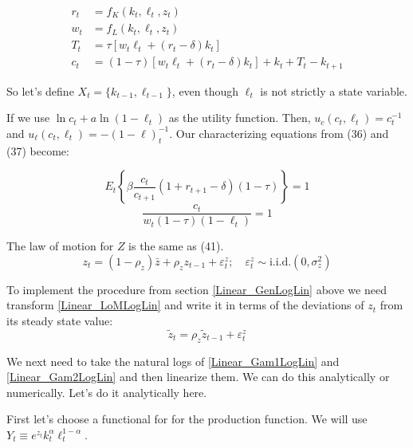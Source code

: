 \documentclass[letterpaper,12pt]{article}
\newcommand{\ve}{\varepsilon}
\theoremstyle{definition}
\begin{document}
\begin{spacing}{1.5}
		\begin{equation}\label{Linear_4defsLogLin}
		\begin{split}
		r_t &= f_K(k_t,\ell_t,z_t) \\
		w_t &= f_L(k_t,\ell_t,z_t) \\
		T_t  &=\tau \left[w_t\ell_t+(r_t-\delta)k_t\right] \\
		c_t &= (1-\tau) \left[w_t\ell_t+(r_t-\delta)k_t\right] + k_t + T_t - k_{t+1}
		\end{split}
		\end{equation}

		So let's define $X_t = \{k_{t-1},\ell_{t-1}\}$, even though $\ell_t$ is not strictly a state variable.

		If we use $\ln c_t + a\ln(1-\ell_t)$ as the utility function. Then, $u_c(c_t,\ell_t) = c_t^{-1}$ and $u_{\ell}(c_t,\ell_t) = -(1-\ell)_t^{-1}$. Our characterizing equations from (36) and (37) become:

		\begin{equation}\label{Linear_Gam1LogLin}
		 E_t\left\{ \beta \frac{c_t}{ c_{t+1}}(1+r_{t+1}-\delta)(1-\tau) \right\} = 1
		\end{equation}
		\begin{equation}\label{Linear_Gam2LogLin}
		\frac{c_t}{w_t(1-\tau)(1-\ell_t)}= 1
		\end{equation}

		The law of motion for $Z$ is the same as (41).
		\begin{equation}\label{Linear_LoMLogLin}
		z_t = (1-\rho_z)\bar z +  \rho_z z_{t-1}+ \ve^z_t ;\quad \ve^z_t\sim\text{i.i.d.}(0,\sigma_z^2)
		\end{equation}

		To implement the procedure from section \ref{Linear_GenLogLin} above we need transform \eqref{Linear_LoMLogLin} and write it in terms of the deviations of $z_t$ from its steady state value:
		\begin{equation}
		\tilde z_t = \rho_z \tilde z_{t-1}+ \ve^z_t
		\end{equation}

		We next need to take the natural logs of \eqref{Linear_Gam1LogLin} and \eqref{Linear_Gam2LogLin} and then linearize them. We can do this analytically or numerically. Let's do it analytically here.

		First let's choose a functional for for the production function. We will use $Y_t \equiv e^{z_t}k_t^\alpha \ell_t^{1-\alpha}$.


\end{spacing}
\end{document}
